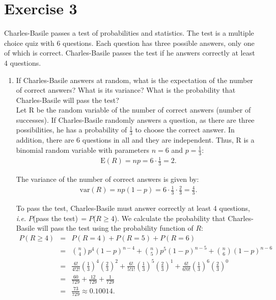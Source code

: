 \documentclass[12pt,thmsa]{article}
\begin{document}
\section*{Exercise 3}

Charles-Basile passes a test of probabilities and statistics. The test is a multiple choice quiz with 6 questions. Each question has three possible answers, only one of which is correct. Charles-Basile passes the test if he answers correctly at least 4 questions.


\begin{enumerate}%
\item If Charles-Basile answers at random, what is the expectation of the number of correct answers?
What is its variance? What is the probability that Charles-Basile will pass the test?\\

Let R be the random variable of the number of correct answers (number of successes). If Charles-Basile randomly answers a question, as there are three possibilities, he has a probability of $\frac{1}{3}$ to choose the correct answer. In addition, there are 6 questions in all and they are independent. Thus, R is a binomial random variable with parameters $n = 6$ and $p = \frac{1}{3}$:
\begin{eqnarray*}
   \text{E}(R)=np=6 \cdot \frac{1}{3}=2.
  \end{eqnarray*}

The variance of the number of correct answers is given by:
      \begin{eqnarray*}
   \text{var}(R)=np(1-p)=6 \cdot \frac{1}{3}\cdot \frac{2}{3}=\frac{4}{3}.
  \end{eqnarray*}

  To pass the test, Charles-Basile must answer correctly at least 4 questions, {\it i.e.} $P$(pass the test)$\,=P$($R\geq 4$). We calculate the probability that Charles-Basile will pass the test using the probability function of $ R $:
\begin{eqnarray*}
   P(R\geq 4) & = & \left. P(R=4) + P(R=5) + P(R=6) \right. \nonumber \\
   & = & \left. \binom{n}{4}p^{4}(1-p)^{n-4} + \binom{n}{5}p^{5}(1-p)^{n-5} + \binom{n}{6}(1-p)^{n-6} \right. \nonumber \\
   & = & \left.  \frac{6!}{4!2!}\left(\frac{1}{3}\right)^{4}\left(\frac{2}{3}\right)^{2} + \frac{6!}{5!1!}\left(\frac{1}{3}\right)^{5}\left(\frac{2}{3}\right)^{1} + \frac{6!}{6!0!}\left(\frac{1}{3}\right)^{6}\left(\frac{2}{3}\right)^{0} \right. \nonumber \\
     & = & \left.  \frac{60}{729} + \frac{12}{729}  + \frac{1}{729}  \right. \nonumber \\
   & = & \left. \frac{73}{729} \approx 0.10014. \right. \nonumber \\
  \end{eqnarray*}


\end{enumerate}
\end{document}
